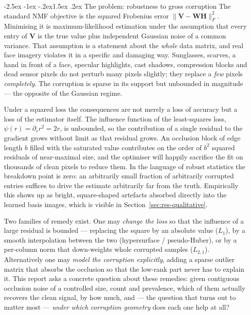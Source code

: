 \documentclass[12pt,a4paper]{article}
\makeatletter
\renewcommand\subsection{\@startsection{subsection}{2}{\z@}%
    {-2.5ex \@plus -1ex \@minus -.2ex}{1.5ex \@plus.2ex}%
    {\normalfont\fontsize{12}{14}\bfseries}}
\newcommand{\bV}{\bm{V}}
\newcommand{\bW}{\bm{W}}
\newcommand{\bH}{\bm{H}}
\makeatother
\begin{document}
\subsection{The problem: robustness to gross corruption}
The standard NMF objective is the squared Frobenius error
$\|\bV - \bW\bH\|_F^2$. Minimising it is maximum-likelihood estimation under
the assumption that every entry of $\bV$ is the true value plus independent
Gaussian noise of a common variance. That assumption is a statement about the
\emph{whole} data matrix, and real face imagery violates it in a specific and
damaging way. Sunglasses, scarves, a hand in front of a face, specular
highlights, cast shadows, compression blocks and dead sensor pixels do not
perturb many pixels slightly; they replace a \emph{few} pixels
\emph{completely}. The corruption is sparse in its support but unbounded in
magnitude --- the opposite of the Gaussian regime.

Under a squared loss the consequences are not merely a loss of accuracy but a
loss of the estimator itself. The influence function of the least-squares
loss, $\psi(r) = \partial_r r^2 = 2r$, is unbounded, so the contribution of a
single residual to the gradient grows without limit as that residual grows. An
occlusion block of edge length $b$ filled with the saturated value contributes
on the order of $b^2$ squared residuals of near-maximal size, and the optimiser
will happily sacrifice the fit on thousands of clean pixels to reduce them. In
the language of robust statistics the breakdown point is zero: an arbitrarily
small fraction of arbitrarily corrupted entries suffices to drive the estimate
arbitrarily far from the truth. Empirically this shows up as bright,
square-shaped artefacts absorbed directly into the learned basis images, which
is visible in Section~\ref{sec:res-qualitative}.

Two families of remedy exist. One may \emph{change the loss} so that the
influence of a large residual is bounded --- replacing the square by an
absolute value ($L_1$), by a smooth interpolation between the two
(hypersurface / pseudo-Huber), or by a per-column norm that down-weights whole
corrupted samples ($L_{2,1}$). Alternatively one may \emph{model the
corruption explicitly}, adding a sparse outlier matrix that absorbs the
occlusion so that the low-rank part never has to explain it. This report asks a
concrete question about these remedies: given contiguous occlusion noise of a
controlled size, count and prevalence, which of them actually recovers the
clean signal, by how much, and --- the question that turns out to matter most
--- \emph{under which corruption geometry} does each one help at all?
\end{document}
